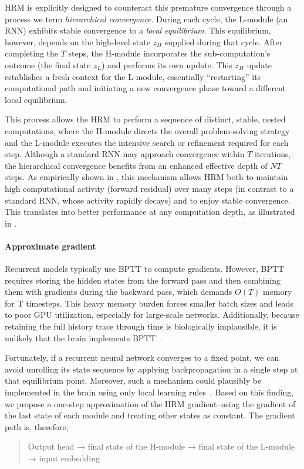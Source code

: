HRM is explicitly designed to counteract this premature convergence through a process we term \textit{hierarchical convergence}. During each cycle, the L-module (an RNN) exhibits stable convergence to a \textit{local equilibrium}. This equilibrium, however, depends on the high-level state $z_H$ supplied during that cycle. After completing the $T$ steps, the H-module incorporates the sub-computation's outcome (the final state $z_L$) and performs its own update. This $z_H$ update establishes a fresh context for the L-module, essentially ``restarting'' its computational path and initiating a new convergence phase toward a different local equilibrium.

This process allows the HRM to perform a sequence of distinct, stable, nested computations, where the H-module directs the overall problem-solving strategy and the L-module executes the intensive search or refinement required for each step. Although a standard RNN may approach convergence within $T$ iterations, the hierarchical convergence benefits from an enhanced effective depth of $NT$ steps. As empirically shown in , this mechanism allows HRM both to maintain high computational activity (forward residual) over many steps (in contrast to a standard RNN, whose activity rapidly decays) and to enjoy stable convergence. This translates into better performance at any computation depth, as illustrated in .

\paragraph{Approximate gradient}
Recurrent models typically use BPTT to compute gradients. However, BPTT requires storing the hidden states from the forward pass and then combining them with gradients during the backward pass, which demands $O(T)$ memory for T timesteps. This heavy memory burden forces smaller batch sizes and leads to poor GPU utilization, especially for large-scale networks. Additionally, because retaining the full history trace through time is biologically implausible, it is unlikely that the brain implements BPTT~\cite{LILLICRAP201982}. 

Fortunately, if a recurrent neural network converges to a fixed point, we can avoid unrolling its state sequence by applying backpropagation in a single step at that equilibrium point. Moreover, such a mechanism could plausibly be implemented in the brain using only local learning rules~\cite{Scellier2016EquilibriumPB, Eprop}. Based on this finding, we propose a one-step approximation of the HRM gradient--using the gradient of the last state of each module and treating other states as constant. The gradient path is, therefore, 
{\small\begin{quote}
    Output head → final state of the H-module → final state of the L-module → input embedding
\end{quote}}

